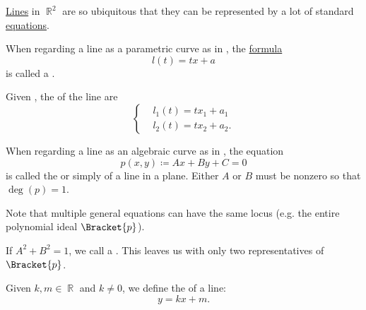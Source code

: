 \begin{definition}\label{def:plane_line_equations}
  \hyperref[def:geometric_line]{Lines} in \( \BbbR^2 \) are so ubiquitous that they can be represented by a lot of standard \hyperref[ex:equations]{equations}.

  \begin{DefEnum}
     When regarding a line as a parametric curve as in , the \hyperref[def:first_order_syntax/formula]{formula}
    \begin{equation}\label{def:plane_line_equations/parametric_equation}
      l(t) = tx + a
    \end{equation}
    is called a .

     Given , the  of the line are
    \begin{equation}\label{def:plane_line_equations/scalar_parametric_equations}
      \begin{cases}
         & l_1(t) = t x_1 + a_1  \\
         & l_2(t) = t x_2 + a_2.
      \end{cases}
    \end{equation}

     When regarding a line as an algebraic curve as in , the equation
    \begin{equation}\label{def:plane_line_equations/general_equation}
      p(x, y) \coloneqq Ax + By + C = 0
    \end{equation}
    is called the  or simply  of a line in a plane. Either \( A \) or \( B \) must be nonzero so that \( \deg(p) = 1 \).

    Note that multiple general equations can have the same locus (e.g. the entire polynomial ideal \( \Bracket{p} \)).

     If \( A^2 + B^2 = 1 \), we call  a . This leaves us with only two representatives of \( \Bracket{p} \).

     Given \( k, m \in \BbbR \) and  \( k \neq 0 \), we define the  of a line:
    \begin{equation}\label{def:plane_line_equations/cartesian_equation}
      y = kx + m.
    \end{equation}


\end{DefEnum}
\end{definition}
